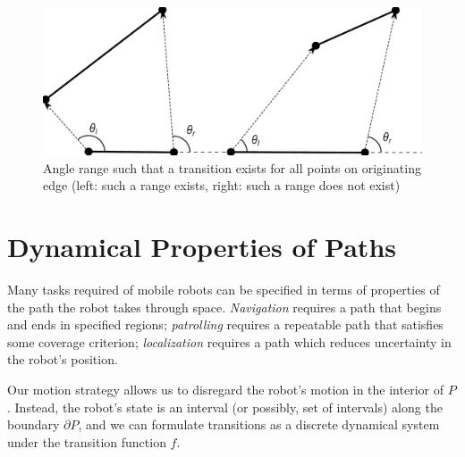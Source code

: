 \documentclass[]{styles/svproc}  %
\begin{document}

\begin{figure}
    \centering
    \includegraphics[width=0.7\linewidth]{figures/bouncerange_min.pdf}
    \caption{Angle range such that a transition exists for all points on
originating edge (left: such a range exists, right: such a range does not
exist)}
\label{fig:bounce_range}
\end{figure}

\section{Dynamical Properties of Paths}

Many tasks required of mobile robots can be specified in terms of properties of
the path the robot takes through space. \emph{Navigation} requires a path that
begins and ends in specified regions; \emph{patrolling} requires a repeatable
path that satisfies some coverage criterion; \emph{localization} requires a path
which reduces uncertainty in the robot's position.

Our motion strategy allows us to disregard the robot's motion in the interior of
$P$. Instead, the robot's state is an interval (or possibly, set of intervals)
along the boundary $\partial P$, and we can formulate transitions as a discrete
dynamical system under the transition function $f$. 
\end{document}
